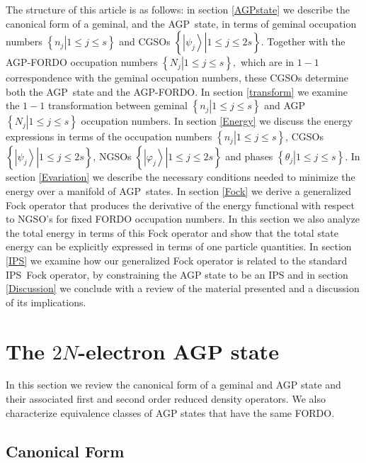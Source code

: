 \documentclass[aps,preprint]{revtex4}%
\begin{document}
The structure of this article is as follows: in section \ref{AGPstate} we
describe the canonical form of a geminal, and the AGP\ state, in terms of
geminal occupation numbers $\left\{  \left.  n_{j}\right\vert 1\leq j\leq
s\right\}  $ and CGSOs $\left\{  \left.  \left\vert \psi_{j}\right\rangle
\right\vert 1\leq j\leq2s\right\}  .$ Together with the AGP-FORDO occupation
numbers $\left\{  \left.  N_{j}\right\vert 1\leq j\leq s\right\}  ,$ which are
in $1-1$ correspondence with the geminal occupation numbers, these CGSOs
determine both the AGP\ state and the AGP-FORDO. In section \ref{transform} we
examine the $1-1$ transformation between geminal $\left\{  \left.
n_{j}\right\vert 1\leq j\leq s\right\}  $ and AGP $\left\{  \left.
N_{j}\right\vert 1\leq j\leq s\right\}  $ occupation numbers. In section
\ref{Energy} we discuss the energy expressions in terms of the occupation
numbers $\left\{  \left.  n_{j}\right\vert 1\leq j\leq s\right\}  $, CGSOs
$\left\{  \left.  \left\vert \psi_{j}\right\rangle \right\vert 1\leq
j\leq2s\right\}  $, NGSOs $\left\{  \left.  \left\vert \varphi_{j}%
\right\rangle \right\vert 1\leq j\leq2s\right\}  $ and phases $\left\{
\left.  \theta_{j}\right\vert 1\leq j\leq s\right\}  .$ In section
\ref{Evariation} we describe the necessary conditions needed to minimize the
energy over a manifold of AGP\ states. In section \ref{Fock} we derive a
generalized Fock operator that produces the derivative of the energy
functional with respect to NGSO's for fixed FORDO occupation numbers. In this
section we also analyze the total energy in terms of this Fock operator and
show that the total state energy can be explicitly expressed in terms of one
particle quantities. In section \ref{IPS} we examine how our generalized Fock
operator is related to the standard IPS\ Fock operator, by constraining the
AGP state to be an IPS and in section \ref{Discussion} we conclude with a
review of the material presented and a discussion of its implications.

\section{The $2N$-electron AGP state\label{AGPstate}}

In this section we review the canonical form of a geminal and AGP state and
their associated first and second order reduced density operators. We also
characterize equivalence classes of AGP states that have the same FORDO.

\subsection{Canonical Form}
\end{document}
